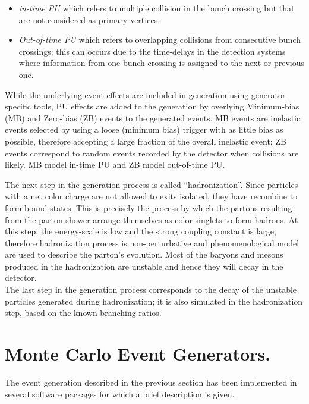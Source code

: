 \begin{itemize}
\item \textit{in-time PU} which refers to multiple \pp collision in the bunch crossing but that are not considered as primary vertices. 
\item \textit{Out-of-time PU} which refers to overlapping \pp collisions from consecutive bunch crossings; this can occurs due to the time-delays in the detection systems where information from one bunch crossing is assigned to the next or previous one. 
\end{itemize}

\noindent While the underlying event effects are included in generation using generator-specific tools, PU effects are added to the generation by overlying Minimum-bias (MB) and Zero-bias (ZB) events to the generated events. MB events are inelastic events selected by using a loose (minimum bias) trigger with as little bias as possible, therefore accepting a large fraction of the overall inelastic event; ZB events correspond to random events recorded by the detector when collisions are likely. MB model in-time PU and ZB model out-of-time PU. 

\noindent The next step in the generation process is called ``hadronization''. Since particles with a net color charge are not allowed to exits isolated, they have recombine to form bound states. This is precisely the process by which the partons resulting from the parton shower arrange themselves as color singlets to form hadrons. At this step, the energy-scale is low and the strong coupling constant is large, therefore hadronization process is non-perturbative and phenomenological model are used to describe the parton's evolution. Most of the baryons and mesons produced in the hadronization are unstable and hence they will decay in the detector.\\

\noindent The last step in the generation process corresponds to the decay of the unstable particles generated during hadronization; it is also simulated in the hadronization step, based on the known branching ratios. 


\section{Monte Carlo Event Generators.}


\noindent The event generation described in the previous section has been implemented in several software packages for which a brief description is given.     

